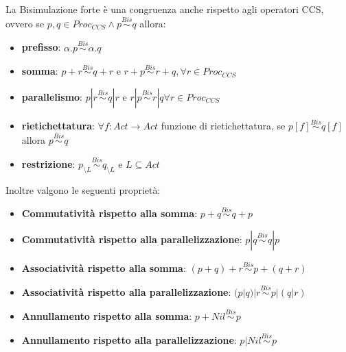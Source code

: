 \begin{osservazione}
    La Bisimulazione forte è una congruenza anche rispetto agli operatori CCS,
    ovvero se $p, q \in Proc_{CCS} \land p \stackrel{Bis}{\sim} q$ allora:
    \begin{itemize}
        \item \textbf{prefisso}: $\alpha.p \stackrel{Bis}{\sim} \alpha.q$
        \item \textbf{somma}: $p + r \stackrel{Bis}{\sim}q + r$ e $r + p \stackrel{Bis}{\sim} r
                  + q, \forall r \in Proc_{CCS}$
        \item \textbf{parallelismo}: $p | r \stackrel{Bis}{\sim} q | r$ e $r | p \stackrel{Bis}{\sim} r | q
                  \forall r \in Proc_{CCS}$
        \item \textbf{rietichettatura}: $\forall f: Act \to Act$ funzione di rietichettatura, se $p[f]
                  \stackrel{Bis}{\sim} q[f]$ allora $p \stackrel{Bis}{\sim} q$
        \item \textbf{restrizione}: $p_{\setminus L} \stackrel{Bis}{\sim} q_{\setminus L}$ e $L \subseteq
                  Act$
    \end{itemize}
\end{osservazione}
\begin{osservazione}
    Inoltre valgono le seguenti proprietà:
    \begin{itemize}
        \item \textbf{Commutatività rispetto alla somma}: $p + q \stackrel{Bis}{\sim}
                  q + p$
        \item \textbf{Commutatività rispetto alla parallelizzazione}: $p | q
                  \stackrel{Bis}{\sim} q | p$
        \item \textbf{Associatività rispetto alla somma}: $(p + q) + r
                  \stackrel{Bis}{\sim} p + (q + r)$
        \item \textbf{Associatività rispetto alla parallelizzazione}: $(p | q) | r
                  \stackrel{Bis}{\sim} p | (q | r)$
        \item \textbf{Annullamento rispetto alla somma}: $p + Nil \stackrel{Bis}{\sim}
                  p$
        \item \textbf{Annullamento rispetto alla parallelizzazione}: $p | Nil
                  \stackrel{Bis}{\sim} p$
    \end{itemize}
\end{osservazione}
